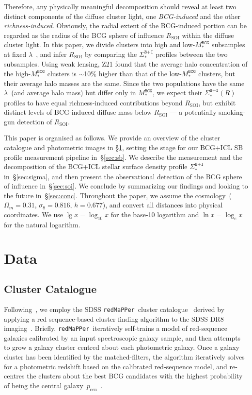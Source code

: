 \documentclass[fleqn,usenatbib]{mnras}
\newcommand{\rsoi}{R_{\mathrm{SOI}}}
\newcommand{\sigbi}{\Sigma_*^{\texttt{B+I}}}
\newcommand{\msbcg}{M_*^{\texttt{BCG}}}
\newcommand{\pcen}{p_{\mathrm{cen}}}
\newcommand\redmapper{\texttt{redMaPPer}}
\begin{document}
Therefore, any physically meaningful decomposition should reveal at least
two distinct components of the diffuse cluster light, one {\it BCG-induced}
and the other {\it richness-induced}.  Obviously, the radial extent of the
BCG-induced portion can be regarded as the radius of the BCG sphere of
influence $\rsoi$ within the diffuse cluster light. In this paper, we
divide clusters into high and low-$\msbcg$ subsamples at fixed
$\lambda$~\citep[see also][hereafter referred to as
]{Zu2021}, and infer $\rsoi$ by comparing the $\sigbi$
profiles between the two subsamples. Using weak lensing, Z21 found that the
average halo concentration of the high-$\msbcg$ clusters is $\sim$10\% higher than
that of the low-$\msbcg$ clusters, but their average halo masses are the
same. Since the two populations have the same $\lambda$~(and average halo
mass) but differ only in $\msbcg$, we expect their $\sigbi(R)$ profiles to
have equal richness-induced contributions beyond $\rsoi$, but exhibit
distinct levels of BCG-induced diffuse mass below $\rsoi$ --- a potentially
smoking-gun detection of $\rsoi$.



This paper is organised as follows. We provide an overview of the cluster
catalogue and photometric images in \S\ref{sec:data}, setting the stage for
our BCG+ICL SB profile measurement pipeline in~\S\ref{sec:sb}. We describe
the measurement and the decomposition of the BCG+ICL stellar surface
density profile $\sigbi$ in~\S\ref{sec:sigma}, and then present the
observational detection of the BCG sphere of influence in~\S\ref{sec:soi}.
We conclude by summarizing our findings and looking to the future
in~\S\ref{sec:conc}.  Throughout the paper, we assume the
\citet{PlanckCollaboration2016} cosmology~($\Omega_m{=}0.31$,
$\sigma_8{=}0.816$, $h{=}0.677$), and convert all distances into physical
coordinates. We use $\lg x=\log_{10}x$ for the base-10 logarithm and $\ln
x=\log_{e}x$ for the natural logarithm.


\section{Data}
\label{sec:data}


\subsection{Cluster Catalogue}
\label{subsec:cls}


Following~, we employ the SDSS \redmapper~cluster
catalogue~\citep{Rykoff2014} derived by applying a red sequence-based
cluster finding algorithm to the SDSS DR8 imaging~\citep{Aihara2011}.
Briefly, \redmapper~iteratively self-trains a model of red-sequence
galaxies calibrated by an input spectroscopic galaxy sample, and then
attempts to grow a galaxy cluster centred about each photometric galaxy.
Once a galaxy cluster has been identified by the matched-filters, the
algorithm iteratively solves for a photometric redshift based on the
calibrated red-sequence model, and re-centres the clusters about the best
BCG candidates with the highest probability of being the central
galaxy~$\pcen$~\citep{Rykoff2014}.
\end{document}
